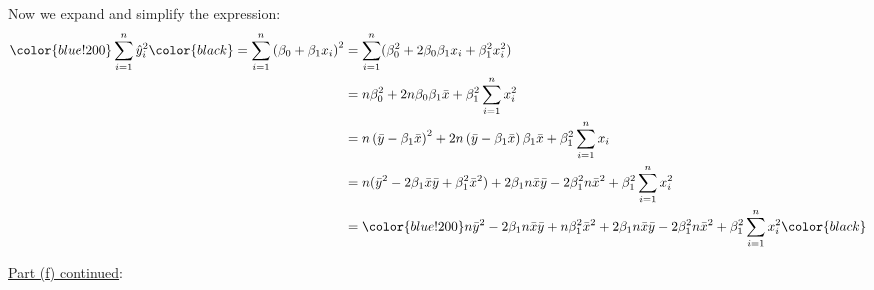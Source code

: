 \documentclass[12pt]{article}
\begin{document}
\begin{enumerate}
\begin{tcolorbox}[colback=white, sharp corners]
Now we expand and simplify the expression: 
\begin{align*}
	\color{blue!200} \sum_{i=1}^n \hat{y}_i^2 \color{black} = \sum_{i=1}^n \left( \beta_0 + \beta_1 x_i \right)^2 
	&= \sum_{i=1}^n (\beta_0^2 + 2 \beta_0 \beta_1 x_i + \beta_1^2 x_i^2) \\
	&= n \beta_0^2 + 2n \beta_0 \beta_1 \bar{x} + \beta_1^2 \sum_{i=1}^n x_i^2 \\
	&= n\left( \bar{y} - \beta_1 \bar{x} \right)^2 + 2n\left( \bar{y} - \beta_1 \bar{x} \right) \beta_1 \bar{x} + \beta_1^2 \sum_{i=1}^n x_i \\
	&= n(\bar{y}^2 - 2\beta_1 \bar{x} \bar{y} + \beta_1^2 \bar{x}^2) + 2\beta_1 n \bar{x} \bar{y} - 2\beta_1^2 n\bar{x}^2 + \beta_1^2 \sum_{i=1}^n x_i^2 \\
	&= \color{blue!200} n \bar{y}^2 - 2 \beta_1 n \bar{x} \bar{y} + n \beta_1^2 \bar{x}^2 + 2 \beta_1 n \bar{x} \bar{y} - 2 \beta_1^2 n \bar{x}^2 + \beta_1^2 \sum_{i=1}^n x_i^2 \color{black}
\end{align*}

\end{tcolorbox}

\newpage 

\begin{tcolorbox}[colback = white, sharp corners]

\underline{Part (f) continued}: 

\vspace{3mm}


\end{tcolorbox}
\end{enumerate}
\end{document}
